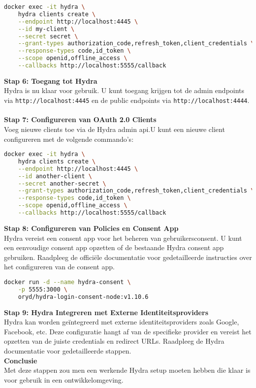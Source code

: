\begin{lstlisting}[language=bash]
docker exec -it hydra \
    hydra clients create \
    --endpoint http://localhost:4445 \
    --id my-client \
    --secret secret \
    --grant-types authorization_code,refresh_token,client_credentials \
    --response-types code,id_token \
    --scope openid,offline_access \
    --callbacks http://localhost:5555/callback
\end{lstlisting}
\textbf{Stap 6: Toegang tot Hydra}\\
Hydra is nu klaar voor gebruik. U kunt toegang krijgen tot de admin endpoints via \texttt{http://localhost:4445} en de public endpoints via \texttt{http://localhost:4444}.\\\\
\textbf{Stap 7: Configureren van OAuth 2.0 Clients}\\
Voeg nieuwe clients toe via de Hydra admin \gls{api}.\@ U kunt een nieuwe client configureren met de volgende commando's:
\begin{lstlisting}[language=bash]
docker exec -it hydra \
    hydra clients create \
    --endpoint http://localhost:4445 \
    --id another-client \
    --secret another-secret \
    --grant-types authorization_code,refresh_token,client_credentials \
    --response-types code,id_token \
    --scope openid,offline_access \
    --callbacks http://localhost:5555/callback
\end{lstlisting}
\textbf{Stap 8: Configureren van Policies en Consent App}\\
Hydra vereist een consent app voor het beheren van gebruikersconsent. U kunt een eenvoudige consent app opzetten of de bestaande Hydra consent app gebruiken. Raadpleeg de officiële documentatie voor gedetailleerde instructies over het configureren van de consent app.
\begin{lstlisting}[language=bash]
docker run -d --name hydra-consent \
    -p 5555:3000 \
    oryd/hydra-login-consent-node:v1.10.6
\end{lstlisting}
\textbf{Stap 9: Hydra Integreren met Externe Identiteitsproviders}\\
Hydra kan worden geïntegreerd met externe identiteitsproviders zoals Google, Facebook, etc. Deze configuratie hangt af van de specifieke provider en vereist het opzetten van de juiste credentials en redirect URLs. Raadpleeg de Hydra documentatie voor gedetailleerde stappen.\\
\textbf{Conclusie}\\
Met deze stappen zou men een werkende Hydra setup moeten hebben die klaar is voor gebruik in een ontwikkelomgeving.


